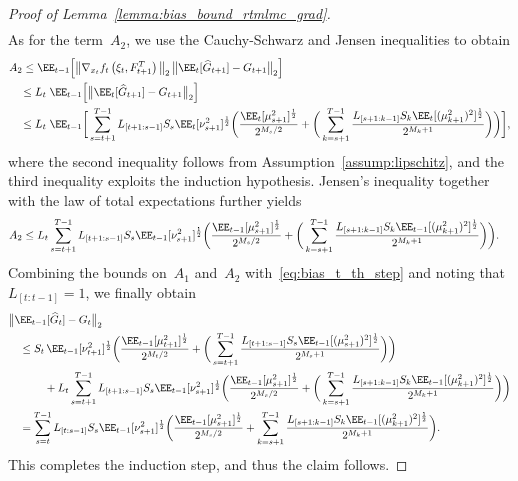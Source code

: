 \documentclass[11pt]{article}
\let\hat\widehat
\begin{document}
\begin{proof}[Proof of Lemma~\ref{lemma:bias_bound_rtmlmc_grad}]
\begin{align*}
\end{align*}
As for the term~$A_2$, we use the Cauchy-Schwarz and Jensen inequalities to obtain
\begin{align*}
    &A_2 \leq  \EE_{t-1}\Big[\big\|\nabla_{x_t} f_t \left(\xi_t,F_{t+1}^T\right)\big\|_2 \, \big\|\EE_{t}[\hat{G}_{t+1}]-G_{t+1}  \big\|_2 \Big]\\
    &\quad \leq  L_t \; \EE_{t-1} \Big[\big\|\EE_{t}[\hat{G}_{t+1}]-G_{t+1} \big\|_2\Big]\\
    &\quad \leq L_t \;\EE_{t-1}\bigg[  \sum_{s=t+1}^{T-1}L_{[t+1:s-1]}S_s \EE_t[\nu_{s+1}^{2}]^\frac{1}{2} \bigg(\frac{\EE_{t}[\mu_{s+1}^{2}]^\frac{1}{2} }{2^{M_s/2}} + \bigg(\sum_{k=s+1}^{T-1} \frac{L_{[s+1:k-1]}S_k\EE_{t}[(\mu_{k+1}^{2})^2]^\frac{1}{2}}{2^{M_k + 1}}\bigg) \bigg) \bigg],
\end{align*}
where the second inequality follows from Assumption~\ref{assump:lipschitz}, and the third inequality exploits the induction hypothesis. Jensen’s inequality together with the law of total expectations further yields
\begin{align*}
&A_2 \leq  L_t \sum_{s=t+1}^{T-1}L_{[t+1:s-1]}S_s \EE_{t-1}[\nu_{s+1}^{2}]^\frac{1}{2} \bigg(\frac{\EE_{t-1}[\mu_{s+1}^{2}]^\frac{1}{2} }{2^{M_s/2}} + \bigg(\sum_{k=s+1}^{T-1} \frac{L_{[s+1:k-1]}S_k\EE_{t-1}[(\mu_{k+1}^{2})^2]^\frac{1}{2}}{2^{M_k + 1}}\bigg) \bigg) .
\end{align*}
Combining the bounds on~$A_1$ and~$A_2$ with~\eqref{eq:bias_t_th_step} and noting that $L_{[t:t-1]}=1$, we finally obtain
\begin{align*}
    &\big\| \EE_{t-1}[\hat{G}_t] - G_t\big\|_2\\
    &\quad \leq S_t \, \EE_{t-1}[\nu_{t+1}^{2}]^\frac{1}{2} \bigg(\frac{\EE_{t-1}[\mu_{t+1}^2]^\frac{1}{2}}{2^{M_t/2}} +\bigg(\sum_{s=t+1}^{T-1} \frac{L_{[t+1:s-1]} S_s \EE_{t-1}[(\mu_{s+1}^{2})^2]^\frac{1}{2}}{2^{M_s + 1}}\bigg) \bigg)   \\
    &\qquad\;\quad + L_t \sum_{s=t+1}^{T-1}L_{[t+1:s-1]}S_s \EE_{t-1}[\nu_{s+1}^{2}]^\frac{1}{2}\bigg(\frac{ \EE_{t-1}[\mu_{s+1}^{2}]^\frac{1}{2} }{2^{M_s/2}} + \bigg(\sum_{k=s+1}^{T-1} \frac{L_{[s+1:k-1]}S_k\EE_{t-1}[(\mu_{k+1}^{2})^2]^\frac{1}{2}}{2^{M_k + 1}}\bigg) \bigg)\\
    &\quad = \sum_{s=t}^{T-1} L_{[t:s-1]}S_s \EE_{t-1}[\nu_{s+1}^{2}]^\frac{1}{2} \bigg(\frac{ \EE_{t-1}[\mu_{s+1}^{2}]^\frac{1}{2}}{2^{M_s/2}} 
    + \sum_{k=s+1}^{T-1} \frac{L_{[s+1:k-1]}S_k\EE_{t-1}[(\mu_{k+1}^{2})^2]^\frac{1}{2}}{2^{M_k+1}}\bigg).
\end{align*}
This completes the induction step, and thus the claim follows.
\end{proof}
\end{document}
